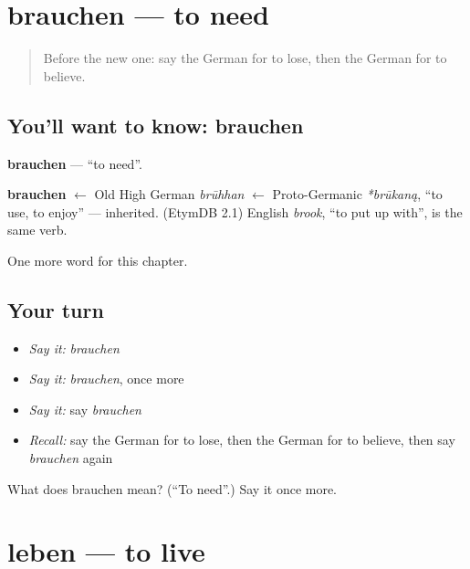 \section[brauchen]{brauchen — to need}

\label{lesson:GE-C67-brauchen}



\begin{quote}
Before the new one: say the German for to lose, then the German for to believe.
\end{quote}

\subsection*{You'll want to know: brauchen}
\textbf{brauchen} — \textquotedblleft{}to need\textquotedblright{}.

\begin{cousinweb}
\textbf{brauchen} $\leftarrow$ Old High German \emph{brūhhan} $\leftarrow$ Proto-Germanic \emph{*brūkaną}, \textquotedblleft{}to use, to enjoy\textquotedblright{} — inherited. (EtymDB 2.1) English \emph{brook}, \textquotedblleft{}to put up with\textquotedblright{}, is the same verb.
\end{cousinweb}

\begin{grammarlens}[title={What you've built}]
One more word for this chapter.
\end{grammarlens}

\subsection*{Your turn}
\begin{itemize}
\raggedright
  \item \emph{Say it:} \emph{brauchen}
  \item \emph{Say it:} \emph{brauchen}, once more
  \item \emph{Say it:} say \emph{brauchen}
  \item \emph{Recall:} say the German for to lose, then the German for to believe, then say \emph{brauchen} again
\end{itemize}

\begin{tcolorbox}[breakable,colback=teal!4,colframe=teal!35!black,title={Before you move on}]
What does brauchen mean? (\textquotedblleft{}To need\textquotedblright{}.) Say it once more.
\end{tcolorbox}
\section[leben]{leben — to live}

